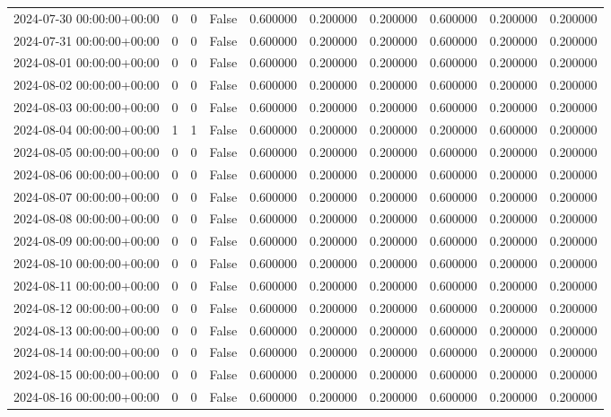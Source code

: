 \begin{tabular}{lrrrrrrrrr}
2024-07-30 00:00:00+00:00 & 0 & 0 & False & 0.600000 & 0.200000 & 0.200000 & 0.600000 & 0.200000 & 0.200000 \\
2024-07-31 00:00:00+00:00 & 0 & 0 & False & 0.600000 & 0.200000 & 0.200000 & 0.600000 & 0.200000 & 0.200000 \\
2024-08-01 00:00:00+00:00 & 0 & 0 & False & 0.600000 & 0.200000 & 0.200000 & 0.600000 & 0.200000 & 0.200000 \\
2024-08-02 00:00:00+00:00 & 0 & 0 & False & 0.600000 & 0.200000 & 0.200000 & 0.600000 & 0.200000 & 0.200000 \\
2024-08-03 00:00:00+00:00 & 0 & 0 & False & 0.600000 & 0.200000 & 0.200000 & 0.600000 & 0.200000 & 0.200000 \\
2024-08-04 00:00:00+00:00 & 1 & 1 & False & 0.600000 & 0.200000 & 0.200000 & 0.200000 & 0.600000 & 0.200000 \\
2024-08-05 00:00:00+00:00 & 0 & 0 & False & 0.600000 & 0.200000 & 0.200000 & 0.600000 & 0.200000 & 0.200000 \\
2024-08-06 00:00:00+00:00 & 0 & 0 & False & 0.600000 & 0.200000 & 0.200000 & 0.600000 & 0.200000 & 0.200000 \\
2024-08-07 00:00:00+00:00 & 0 & 0 & False & 0.600000 & 0.200000 & 0.200000 & 0.600000 & 0.200000 & 0.200000 \\
2024-08-08 00:00:00+00:00 & 0 & 0 & False & 0.600000 & 0.200000 & 0.200000 & 0.600000 & 0.200000 & 0.200000 \\
2024-08-09 00:00:00+00:00 & 0 & 0 & False & 0.600000 & 0.200000 & 0.200000 & 0.600000 & 0.200000 & 0.200000 \\
2024-08-10 00:00:00+00:00 & 0 & 0 & False & 0.600000 & 0.200000 & 0.200000 & 0.600000 & 0.200000 & 0.200000 \\
2024-08-11 00:00:00+00:00 & 0 & 0 & False & 0.600000 & 0.200000 & 0.200000 & 0.600000 & 0.200000 & 0.200000 \\
2024-08-12 00:00:00+00:00 & 0 & 0 & False & 0.600000 & 0.200000 & 0.200000 & 0.600000 & 0.200000 & 0.200000 \\
2024-08-13 00:00:00+00:00 & 0 & 0 & False & 0.600000 & 0.200000 & 0.200000 & 0.600000 & 0.200000 & 0.200000 \\
2024-08-14 00:00:00+00:00 & 0 & 0 & False & 0.600000 & 0.200000 & 0.200000 & 0.600000 & 0.200000 & 0.200000 \\
2024-08-15 00:00:00+00:00 & 0 & 0 & False & 0.600000 & 0.200000 & 0.200000 & 0.600000 & 0.200000 & 0.200000 \\
2024-08-16 00:00:00+00:00 & 0 & 0 & False & 0.600000 & 0.200000 & 0.200000 & 0.600000 & 0.200000 & 0.200000 \\

\end{tabular}
